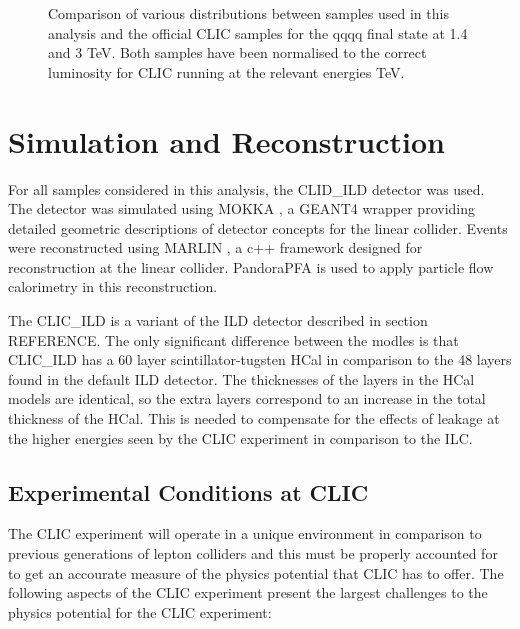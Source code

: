 \begin{figure}
\caption[Comparison of various distributions between samples used in this analysis and the official CLIC samples for the \nu{\nu}qqqq final state at 1.4 and 3 TeV.]{Comparison of various distributions between samples used in this analysis and the official CLIC samples for the \nu{\nu}qqqq final state at 1.4 and 3 TeV.  Both samples have been normalised to the correct luminosity for CLIC running at the relevant energies TeV.}
\label{fig:cliccomp}
\end{figure}

\section{Simulation and Reconstruction}
For all samples considered in this analysis, the CLID\_ILD detector \cite{arXiv:1006.3396} was used.  The detector was simulated using MOKKA \cite{MoradeFreitas:2002kj}, a GEANT4 \cite{Agostinelli:2002hh} wrapper providing detailed geometric descriptions of detector concepts for the linear collider.  Events were reconstructed using MARLIN \cite{Gaede:2006pj}, a c++ framework designed for reconstruction at the linear collider.  PandoraPFA \cite{arXiv:0907.3577, arXiv:1209.4039} is used to apply particle flow calorimetry in this reconstruction.
 
The CLIC\_ILD is a variant of the ILD detector described in section REFERENCE.  The only significant difference between the modles is that CLIC\_ILD has a 60 layer scintillator-tugsten HCal in comparison to the 48 layers found in the default ILD detector.  The thicknesses of the layers in the HCal models are identical, so the extra layers correspond to an increase in the total thickness of the HCal.  This is needed to compensate for the effects of leakage at the higher energies seen by the CLIC experiment in comparison to the ILC. 

\subsection{Experimental Conditions at CLIC}
The CLIC experiment will operate in a unique environment in comparison to previous generations of lepton colliders and this must be properly accounted for to get an accourate measure of the physics potential that CLIC has to offer.  The following aspects of the CLIC experiment present the largest challenges to the physics potential for the CLIC experiment:

